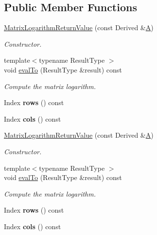 \subsection*{Public Member Functions}
\begin{DoxyCompactItemize}
\item 
\hyperlink{class_eigen_1_1_matrix_logarithm_return_value_adfd2417a3d6f671e156b4ab1b92f1837}{Matrix\+Logarithm\+Return\+Value} (const Derived \&\hyperlink{group___core___module_class_eigen_1_1_matrix}{A})
\begin{DoxyCompactList}\small\item\em Constructor. \end{DoxyCompactList}\item 
{\footnotesize template$<$typename Result\+Type $>$ }\\void \hyperlink{class_eigen_1_1_matrix_logarithm_return_value_ac17537a51ce53a44746fabd7a83d29d3}{eval\+To} (Result\+Type \&result) const
\begin{DoxyCompactList}\small\item\em Compute the matrix logarithm. \end{DoxyCompactList}\item 
\mbox{\label{class_eigen_1_1_matrix_logarithm_return_value_a13acb69f8ba2d48f84e508a19605a2a6}} 
Index {\bfseries rows} () const
\item 
\mbox{\label{class_eigen_1_1_matrix_logarithm_return_value_a5f2f251989faf25e0cbbdfe6883ea50c}} 
Index {\bfseries cols} () const
\item 
\hyperlink{class_eigen_1_1_matrix_logarithm_return_value_adfd2417a3d6f671e156b4ab1b92f1837}{Matrix\+Logarithm\+Return\+Value} (const Derived \&\hyperlink{group___core___module_class_eigen_1_1_matrix}{A})
\begin{DoxyCompactList}\small\item\em Constructor. \end{DoxyCompactList}\item 
{\footnotesize template$<$typename Result\+Type $>$ }\\void \hyperlink{class_eigen_1_1_matrix_logarithm_return_value_ac17537a51ce53a44746fabd7a83d29d3}{eval\+To} (Result\+Type \&result) const
\begin{DoxyCompactList}\small\item\em Compute the matrix logarithm. \end{DoxyCompactList}\item 
\mbox{\label{class_eigen_1_1_matrix_logarithm_return_value_a13acb69f8ba2d48f84e508a19605a2a6}} 
Index {\bfseries rows} () const
\item 
\mbox{\label{class_eigen_1_1_matrix_logarithm_return_value_a5f2f251989faf25e0cbbdfe6883ea50c}} 
Index {\bfseries cols} () const
\end{DoxyCompactItemize}
